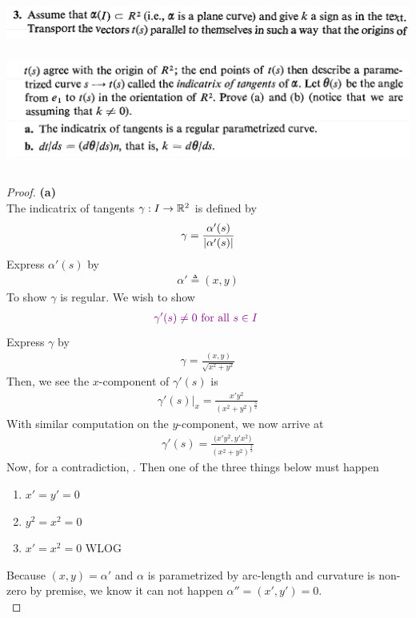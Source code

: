 \documentclass{report}
\begin{document}
\begin{question}{}{}
\includegraphics[height=1.5cm,width=18cm]{hw2q3}
\includegraphics[height=4cm,width=18cm]{hw2q2}
\end{question}
\begin{proof}
\textbf{(a)}\\

The indicatrix of tangents $\gamma :I \rightarrow \mathbb{R}^2$ is defined by 
\begin{align*}
\gamma = \frac{\alpha '(s)}{\left|\alpha '(s)\right|}
\end{align*}
Express $\alpha '(s)$ by 
\begin{align*}
\alpha ' \triangleq (x,y)
\end{align*}
To show $\gamma $ is regular. We wish to show 
\begin{align*}
  \textcolor{violet}{\gamma '(s)\neq 0\text{ for all $s \in I$ }}
\end{align*}
Express $\gamma $ by 
\begin{align*}
\gamma =\frac{(x,y)}{\sqrt{x^2+y^2} }
\end{align*}
Then, we see the $x$-component of  $\gamma '(s)$ is 
\begin{align*}
\gamma '(s)\Big|_x= \frac{x'y^2}{(x^2+y^2)^{\frac{3}{2}}}
\end{align*}
With similar computation on the $y$-component, we now arrive at 
 \begin{align*}
\gamma '(s)=\frac{\Big(x'y^2,y'x^2 \Big)}{(x^2+y^2)^{\frac{3}{2}}}
\end{align*}
Now, for a contradiction, . Then one of the three things below must happen 
\begin{enumerate}[label=(\alph*)]
  \item $x'=y'=0$ 
  \item $y^2=x^2=0$ 
  \item $x'=x^2=0$ WLOG
\end{enumerate}
Because $(x,y)=\alpha '$ and $\alpha $ is parametrized by arc-length and  curvature is non-zero by premise, we know it can not happen $\alpha ''=(x',y')=0$.\\


\end{proof}
\end{document}
